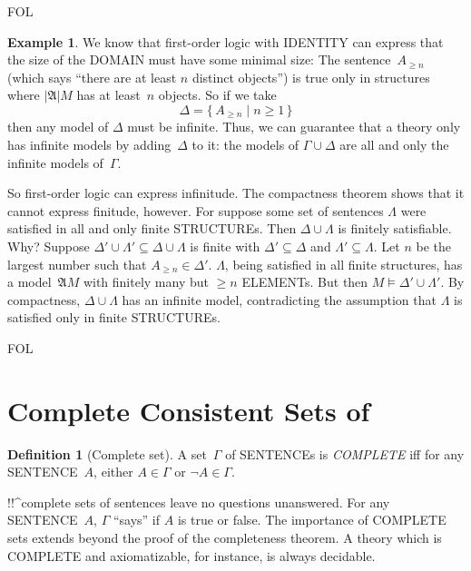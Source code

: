 \documentclass[10pt,a4paper]{article}
\newcommand*{\olup}[1]{\MakeUppercase{#1}}
\theoremstyle{plain}
\theoremstyle{definition}
\newtheorem{defn}[thm]{Definition}
\newtheorem{ex}[thm]{Example}
\theoremstyle{remark}
\newenvironment{explain}{}{}
\newcommand*{\olfileid}[3]{}
\newcommand*{\olsection}[1]{\section*{#1}}
\newcommand*{\ollabel}[1]{\label{#1}}
\providecommand{\Struct}{\ensuremath{\mathfrak{A}}}
\providecommand{\Domain}{\ensuremath{|\mathfrak{A}|}}
\providecommand{\Sat}[2]{\ensuremath{#1 \models #2}}
\providecommand{\iftag}[1]{#1}
\providecommand{\Setabs}[2]{\{\, #1 \mid #2 \,\}}
\providecommand{\iftag}{}
\begin{document}
\iftag{FOL}{
\begin{ex}
We know that first-order logic with \olup{identity} can express that the
size of the \olup{domain} must have some minimal size: The
sentence~$A_{\ge n}$ (which says ``there are at least $n$ distinct
objects'') is true only in structures where $\Domain{M}$ has at
least~$n$ objects. So if we take
  \[
  \Delta = \Setabs{A_{\ge n}}{n \ge 1}
  \]
then any model of $\Delta$ must be infinite. Thus, we can guarantee
that a theory only has infinite models by adding~$\Delta$ to it: the
models of $\Gamma \cup \Delta$ are all and only the infinite models
of~$\Gamma$.

So first-order logic can express infinitude. The compactness theorem
shows that it cannot express finitude, however. For suppose some set
of sentences $\Lambda$ were satisfied in all and only finite
\olup{structure}s. Then $\Delta \cup \Lambda$ is finitely
satisfiable. Why? Suppose $\Delta' \cup \Lambda' \subseteq \Delta \cup
\Lambda$ is finite with $\Delta' \subseteq \Delta$ and $\Lambda'
\subseteq \Lambda$. Let $n$ be the largest number such that $A_{\ge n}
\in \Delta'$. $\Lambda$, being satisfied in all finite structures, has
a model~$\Struct{M}$ with finitely many but $\ge n$ \olup{element}s. But
then $\Sat{M}{\Delta' \cup \Lambda'}$.  By compactness, $\Delta \cup
\Lambda$ has an infinite model, contradicting the assumption that
$\Lambda$ is satisfied only in finite \olup{structure}s.
\end{ex}
}{}






\iftag{FOL}
      {\olfileid{fol}{com}{ccs}}
      {\olfileid{pl}{com}{ccs}}
      
\olsection{Complete Consistent Sets of }

\begin{defn}[Complete set]
\ollabel{def:complete-set} A set~$\Gamma$ of \olup{sentence}s is
\emph{\olup{complete}} iff for any \olup{sentence}~$A$, either $A \in
\Gamma$ or $\lnot A \in \Gamma$.
\end{defn}

\begin{explain}
!!^{complete} sets of sentences leave no questions unanswered. For
any \olup{sentence}~$A$, $\Gamma$ ``says'' if $A$ is true or false.  The
importance of \olup{complete} sets extends beyond the proof of the
completeness theorem. A theory which is \olup{complete} and
axiomatizable, for instance, is always decidable.
\end{explain}
\end{document}
